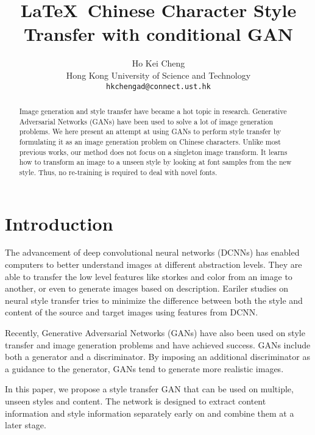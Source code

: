 \documentclass[10pt,twocolumn,letterpaper]{article}
\begin{document}
\title{\LaTeX\ Chinese Character Style Transfer with conditional GAN}

\author{Ho Kei Cheng\\
Hong Kong University of Science and Technology\\
{\tt\small hkchengad@connect.ust.hk}
}

\maketitle

\begin{abstract}
	Image generation and style transfer have became a hot topic in research. 
	Generative Adversarial Networks (GANs) have been used to solve a lot of image generation
	problems. We here present an attempt at using GANs to perform style transfer by formulating
	it as an image generation problem on Chinese characters. Unlike most previous works, 
	our method does not focus on a singleton image transform. It learns how to transform an image
	to a unseen style by looking at font samples from the new style. Thus, no re-training is required
	to deal with novel fonts.
\end{abstract}

\section{Introduction}
The advancement of deep convolutional neural networks (DCNNs) has enabled computers
to better understand images at different abstraction levels. 
They are able to transfer the low level features like storkes and color
from an image to another, or even to generate images based on description.
Eariler studies on neural style transfer tries to minimize the difference 
between both the style and content of the source and target images using 
features from DCNN. 

Recently, Generative Adversarial Networks (GANs) have also been used on
style transfer and image generation problems and have achieved success. GANs include both a generator and a discriminator. By imposing an additional discriminator as a guidance to the generator, GANs tend to generate more realistic images.

In this paper, we propose a style transfer GAN that can be used on multiple, unseen styles and content. The network is designed to extract content information and style information separately early on and combine them at a later stage. 
\end{document}
